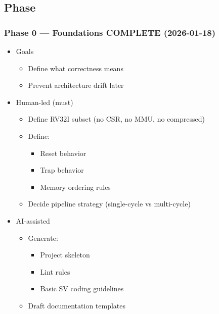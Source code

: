 \subsection{Phase}\label{cr:status:roadmap:phase}

\subsubsection{\texorpdfstring{Phase 0 --- Foundations \ok{} COMPLETE
(2026-01-18)}{Phase 0 --- Foundations  COMPLETE (2026-01-18)}}\label{cr:status:roadmap:phase-0-foundations-white-check-mark-complete-2026-01-18}

\begin{record}

\begin{itemize}
\tightlist
\item
  Goals

  \begin{itemize}
  \tightlist
  \item
    Define what correctness means
  \item
    Prevent architecture drift later
  \end{itemize}
\item
  Human-led (must)

  \begin{itemize}
  \tightlist
  \item
    Define RV32I subset (no CSR, no MMU, no compressed)
  \item
    Define:

    \begin{itemize}
    \tightlist
    \item
      Reset behavior
    \item
      Trap behavior
    \item
      Memory ordering rules
    \end{itemize}
  \item
    Decide pipeline strategy (single-cycle vs multi-cycle)
  \end{itemize}
\item
  AI-assisted

  \begin{itemize}
  \tightlist
  \item
    Generate:

    \begin{itemize}
    \tightlist
    \item
      Project skeleton
    \item
      Lint rules
    \item
      Basic SV coding guidelines
    \end{itemize}
  \item
    Draft documentation templates
  \end{itemize}
\end{itemize}


\end{record}

